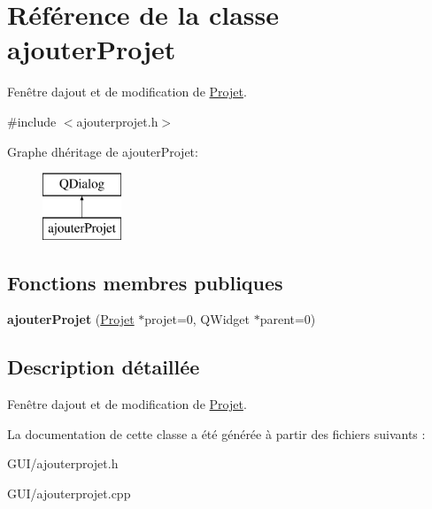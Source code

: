 \hypertarget{classajouter_projet}{}\section{Référence de la classe ajouter\+Projet}
\label{classajouter_projet}


Fenêtre d\textquotesingle{}ajout et de modification de \hyperlink{class_projet}{Projet}.  




{\ttfamily \#include $<$ajouterprojet.\+h$>$}

Graphe d\textquotesingle{}héritage de ajouter\+Projet\+:\begin{figure}[H]
\begin{center}
\leavevmode
\includegraphics[height=2.000000cm]{classajouter_projet}
\end{center}
\end{figure}
\subsection*{Fonctions membres publiques}
\begin{DoxyCompactItemize}
\item 
\hypertarget{classajouter_projet_a8d01a20eb1e6ee26473468edc1139fee}{}{\bfseries ajouter\+Projet} (\hyperlink{class_projet}{Projet} $\ast$projet=0, Q\+Widget $\ast$parent=0)\label{classajouter_projet_a8d01a20eb1e6ee26473468edc1139fee}

\end{DoxyCompactItemize}


\subsection{Description détaillée}
Fenêtre d\textquotesingle{}ajout et de modification de \hyperlink{class_projet}{Projet}. 

La documentation de cette classe a été générée à partir des fichiers suivants \+:\begin{DoxyCompactItemize}
\item 
G\+U\+I/ajouterprojet.\+h\item 
G\+U\+I/ajouterprojet.\+cpp\end{DoxyCompactItemize}
